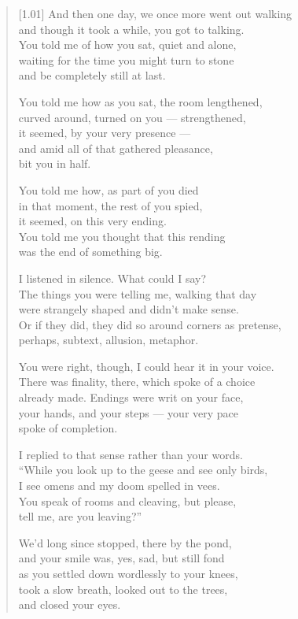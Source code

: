 \begin{verse}[1.01\textwidth]
And then one day, we once more went out walking\\
and though it took a while, you got to talking.\\
You told me of how  you sat, quiet and alone,\\
waiting for the time you might turn to stone\\
and be completely still at last.

\newpage

You told me how as you sat, the room lengthened,\\
curved around, turned on you --- strengthened,\\
it seemed, by your very presence ---\\
and amid all of that gathered pleasance,\\
bit you in half.

You told me how, as part of you died\\
in that moment, the rest of you spied,\\
it seemed, on this very ending.\\
You told me you thought that this rending\\
was the end of something big.

I listened in silence. What could I say?\\
The things you were telling me, walking that day\\
were strangely shaped and didn't make sense.\\
Or if they did, they did so around corners as pretense,\\
perhaps, subtext, allusion, metaphor.

You were right, though, I could hear it in your voice.\\
There was finality, there, which spoke of a choice\\
already made. Endings were writ on your face,\\
your hands, and your steps --- your very pace\\
spoke of completion.

I replied to that sense rather than your words.\\
``While you look up to the geese and see only birds,\\
I see omens and my doom spelled in vees.\\
You speak of rooms and cleaving, but please,\\
tell me, are you leaving?''

We'd long since stopped, there by the pond,\\
and your smile was, yes, sad, but still fond\\
as you settled down wordlessly to your knees,\\
took a slow breath, looked out to the trees,\\
and closed your eyes.


\end{verse}
